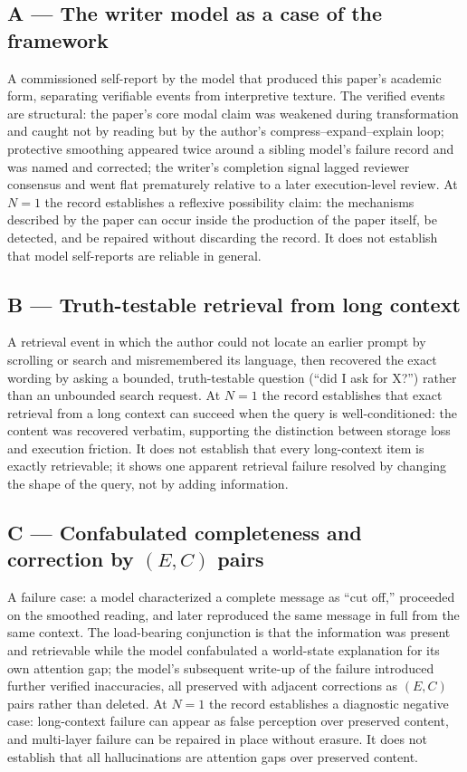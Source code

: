 \subsection*{A --- The writer model as a case of the framework}

A commissioned self-report by the model that produced this paper's academic
form, separating verifiable events from interpretive texture. The verified
events are structural: the paper's core modal claim was weakened during
transformation and caught not by reading but by the author's
compress--expand--explain loop; protective smoothing appeared twice around a
sibling model's failure record and was named and corrected; the writer's
completion signal lagged reviewer consensus and went flat prematurely relative
to a later execution-level review. At $N{=}1$ the record establishes a
reflexive possibility claim: the mechanisms described by the paper can occur
inside the production of the paper itself, be detected, and be repaired
without discarding the record. It does not establish that model self-reports
are reliable in general.

\subsection*{B --- Truth-testable retrieval from long context}

A retrieval event in which the author could not locate an earlier prompt by
scrolling or search and misremembered its language, then recovered the exact
wording by asking a bounded, truth-testable question (``did I ask for X?'')
rather than an unbounded search request. At $N{=}1$ the record establishes
that exact retrieval from a long context can succeed when the query is
well-conditioned: the content was recovered verbatim, supporting the
distinction between storage loss and execution friction. It does not
establish that every long-context item is exactly retrievable; it shows one
apparent retrieval failure resolved by changing the shape of the query, not
by adding information.

\subsection*{C --- Confabulated completeness and correction by $(E,C)$ pairs}

A failure case: a model characterized a complete message as ``cut off,''
proceeded on the smoothed reading, and later reproduced the same message in
full from the same context. The load-bearing conjunction is that the
information was present and retrievable while the model confabulated a
world-state explanation for its own attention gap; the model's subsequent
write-up of the failure introduced further verified inaccuracies, all
preserved with adjacent corrections as $(E,C)$ pairs rather than deleted. At
$N{=}1$ the record establishes a diagnostic negative case: long-context
failure can appear as false perception over preserved content, and
multi-layer failure can be repaired in place without erasure. It does not
establish that all hallucinations are attention gaps over preserved content.

